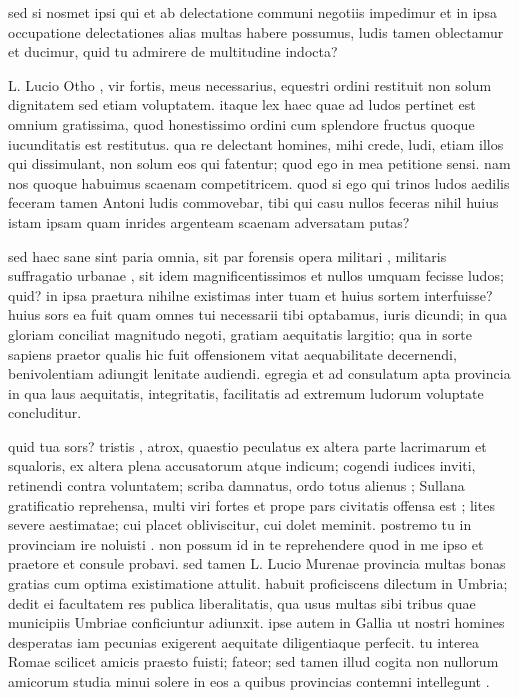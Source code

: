  sed si nosmet ipsi qui et ab delectatione communi negotiis impedimur et in ipsa occupatione delectationes alias multas habere possumus, ludis tamen oblectamur et ducimur, quid tu admirere de multitudine indocta?

 L. Lucio Otho , vir fortis, meus necessarius, equestri ordini restituit non solum dignitatem sed etiam voluptatem. itaque lex haec quae ad ludos pertinet est omnium gratissima, quod honestissimo ordini cum splendore fructus quoque iucunditatis est restitutus. qua re delectant homines, mihi crede, ludi, etiam illos qui dissimulant, non solum eos qui fatentur; quod ego in mea petitione sensi. nam nos quoque habuimus scaenam competitricem. quod si ego qui trinos ludos aedilis feceram tamen Antoni ludis commovebar, tibi qui casu nullos feceras nihil huius istam ipsam quam inrides argenteam scaenam adversatam putas?

 sed haec sane sint paria omnia, sit par forensis opera militari , militaris suffragatio urbanae , sit idem magnificentissimos et nullos umquam fecisse ludos; quid? in ipsa praetura nihilne existimas inter tuam et huius sortem interfuisse? huius sors ea fuit quam omnes tui necessarii tibi optabamus, iuris dicundi; in qua gloriam conciliat magnitudo negoti, gratiam aequitatis largitio; qua in sorte sapiens praetor qualis hic fuit offensionem vitat aequabilitate decernendi, benivolentiam adiungit lenitate audiendi. egregia et ad consulatum apta provincia in qua laus aequitatis, integritatis, facilitatis ad extremum ludorum voluptate concluditur.

 quid tua sors? tristis , atrox, quaestio peculatus ex altera parte lacrimarum et squaloris, ex altera plena accusatorum atque indicum; cogendi iudices inviti, retinendi contra voluntatem; scriba damnatus, ordo totus alienus ; Sullana gratificatio reprehensa, multi viri fortes et prope pars civitatis offensa est ; lites severe aestimatae; cui placet obliviscitur, cui dolet meminit. postremo tu in provinciam ire noluisti . non possum id in te reprehendere quod in me ipso et praetore et consule probavi. sed tamen L. Lucio Murenae provincia multas bonas gratias cum optima existimatione attulit. habuit proficiscens dilectum in Umbria; dedit ei facultatem res publica liberalitatis, qua usus multas sibi tribus quae municipiis Umbriae conficiuntur adiunxit. ipse autem in Gallia ut nostri homines desperatas iam pecunias exigerent aequitate diligentiaque perfecit. tu interea Romae scilicet amicis praesto fuisti; fateor; sed tamen illud cogita non nullorum amicorum studia minui solere in eos a quibus provincias contemni intellegunt .


